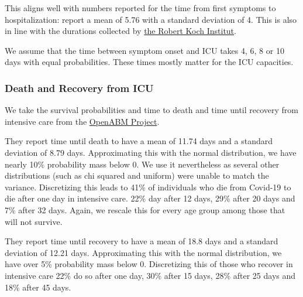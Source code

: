 This aligns well with numbers reported for the time from first symptoms to hospitalization: \citet{Gaythorpe2020} report a mean of 5.76 with a standard deviation of 4. This is also in line with the durations collected by \href{https://www.rki.de/DE/Content/InfAZ/N/Neuartiges_Coronavirus/Steckbrief.html#doc13776792bodyText16}{the Robert Koch Institut}.

We assume that the time between symptom onset and ICU takes 4, 6, 8 or 10 days with equal probabilities. These times mostly matter for the ICU capacities.


\subsubsection{Death and Recovery from ICU}

We take the survival probabilities and time to death and time until recovery from intensive care from the \href{https://tinyurl.com/y5owhyts}{OpenABM Project}.

They report time until death to have a mean of 11.74 days and a standard deviation of 8.79 days. Approximating this with the normal distribution, we have nearly 10\% probability mass below 0. We use it nevertheless as several other distributions (such as chi squared and uniform) were unable to match the variance.
Discretizing this leads to 41\% of individuals who die from Covid-19 to die after one day in intensive care. 22\% day after 12 days, 29\% after 20 days and 7\% after 32 days. Again, we rescale this for every age group among those that will not survive.

They report time until recovery to have a mean of 18.8 days and a standard deviation of 12.21 days. Approximating this with the normal distribution, we have over 5\% probability mass below 0. Discretizing this of those who recover in intensive care 22\% do so after one day, 30\% after 15 days, 28\% after 25 days and 18\% after 45 days.